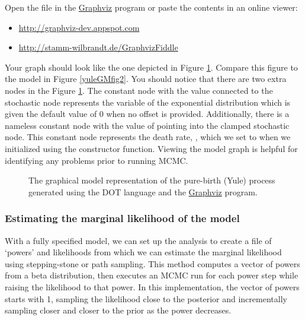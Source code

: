 Open the  file in the \href{http://www.graphviz.org/}{Graphviz} program or paste the contents in an online viewer:
\begin{itemize}[noitemsep,nolistsep]
  \item \href{http://graphviz-dev.appspot.com/}{http://graphviz-dev.appspot.com}
  \item \href{http://stamm-wilbrandt.de/GraphvizFiddle/}{http://stamm-wilbrandt.de/GraphvizFiddle}
\end{itemize}

Your graph should look like the one depicted in Figure \ref{yuleGMGVfig}.
Compare this figure to the model in Figure \ref{yuleGMfig2}.
You should notice that there are two extra nodes in the Figure \ref{yuleGMGVfig}. 
The constant node with the value  connected to the  stochastic node represents the  variable of the exponential distribution which is given the default value of 0 when no offset is provided. 
Additionally, there is a nameless constant node with the value of  pointing into the clamped  stochastic node. 
This constant node represents the death rate, , which we set to  when we initialized  using the  constructor function.
Viewing the model graph is helpful for identifying any problems prior to running MCMC. 
\begin{figure}[h!]
\centering
{}
\caption{\small The graphical model representation of the pure-birth (Yule) process generated using the DOT language and the \href{http://www.graphviz.org/}{Graphviz} program.}
\label{yuleGMGVfig}
\end{figure}


\subsubsection{Estimating the marginal likelihood of the model}

With a fully specified model, we can set up the  analysis to create a file of `powers' and likelihoods from which we can estimate the marginal likelihood using stepping-stone or path sampling. 
This method computes a vector of powers from a beta distribution, then executes an MCMC run for each power step while raising the likelihood to that power. In this implementation, the vector of powers starts with 1, sampling the likelihood close to the posterior and incrementally sampling closer and closer to the prior as the power decreases. 

